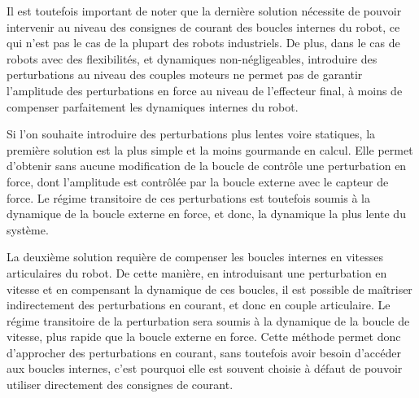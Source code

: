 Il est toutefois important de noter que la dernière solution nécessite de pouvoir intervenir au niveau des consignes de courant des boucles internes du robot, ce qui n'est pas le cas de la plupart des robots industriels. De plus, dans le cas de robots avec des flexibilités, et dynamiques non-négligeables, introduire des perturbations au niveau des couples moteurs ne permet pas de garantir l'amplitude des perturbations en force au niveau de l'effecteur final, à moins de compenser parfaitement les dynamiques internes du robot. 

Si l'on souhaite introduire des perturbations plus lentes voire statiques, la première solution est la plus simple et la moins gourmande en calcul. Elle permet d'obtenir sans aucune modification de la boucle de contrôle une perturbation en force, dont l'amplitude est contrôlée par la boucle externe avec le capteur de force. Le régime transitoire de ces perturbations est toutefois soumis à la dynamique de la boucle externe en force, et donc, la dynamique la plus lente du système. 

La deuxième solution requière de compenser les boucles internes en vitesses articulaires du robot. De cette manière, en introduisant une perturbation en vitesse et en compensant la dynamique de ces boucles, il est possible de maîtriser indirectement des perturbations en courant, et donc en couple articulaire. Le régime transitoire de la perturbation sera soumis à la dynamique de la boucle de vitesse, plus rapide que la boucle externe en force. Cette méthode permet donc d'approcher des perturbations en courant, sans toutefois avoir besoin d'accéder aux boucles internes, c'est pourquoi elle est souvent choisie à défaut de pouvoir utiliser directement des consignes de courant.



